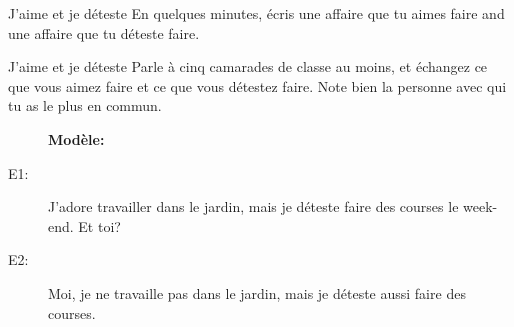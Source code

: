 \begin{frame}{J'aime et je déteste}
  En quelques minutes, écris une affaire que tu aimes faire and une affaire que tu déteste faire. \\
\end{frame}

\begin{frame}{J'aime et je déteste}
  Parle à cinq camarades de classe au moins, et échangez ce que vous aimez faire et ce que vous détestez faire.
  Note bien la personne avec qui tu as le plus en commun. \\
  \begin{center}
    \begin{description}
      \item[] \textbf{Modèle:}
      \item[E1:] J'adore travailler dans le jardin, mais je déteste faire des courses le week-end. Et toi?
      \item[E2:] Moi, je ne travaille pas dans le jardin, mais je déteste aussi faire des courses.
    \end{description}
  \end{center}
\end{frame}